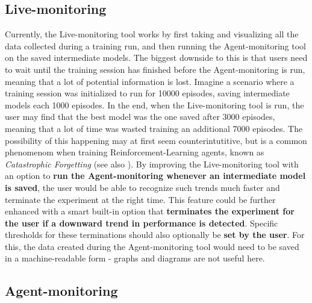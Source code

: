 \subsection*{Live-monitoring}\label{subsec:FutureLiveMonitoring}

Currently, the Live-monitoring tool works by first taking and visualizing all the data collected during a training run, and then running the Agent-monitoring tool on the saved intermediate models. The biggest downside to this is that users need to wait until the training session has finished before the Agent-monitoring is run, meaning that a lot of potential information is lost. Imagine a scenario where a training session was initialized to run for 10000 episodes, saving intermediate models each 1000 episodes. In the end, when the Live-monitoring tool is run, the user may find that the best model was the one saved after 3000 episodes, meaning that a lot of time was wasted training an additional 7000 episodes. The possibility of this happening may at first seem counterintutitive, but is a common phenomenom when training Reinforcement-Learning agents, known as \emph{Catastrophic Forgetting} (see also \cite{CatastrophicForgetting}). By improving the Live-monitoring tool with an option to \textbf{run the Agent-monitoring whenever an intermediate model is saved}, the user would be able to recognize such trends much faster and terminate the experiment at the right time. This feature could be further enhanced with a smart built-in option that \textbf{terminates the experiment for the user if a downward trend in performance is detected}. Specific thresholds for these terminations should also optionally be \textbf{set by the user}. For this, the data created during the Agent-monitoring tool would need to be saved in a machine-readable form - graphs and diagrams are not useful here.

\subsection*{Agent-monitoring}\label{subsec:FutureAgentMonitoring}

